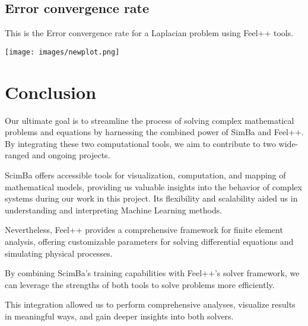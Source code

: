 \documentclass[12pt]{article}
\begin{document}

\newpage

\subsection{Error convergence rate }

This is the Error convergence rate for a Laplacian problem using Feel++ tools. 
\begin{frame}{}
    \begin{center}
        \texttt{[image: images/newplot.png]}
    \end{center}
\end{frame}



\newpage

\section{Conclusion}

Our ultimate goal is to streamline the process of solving complex mathematical problems and equations by harnessing the combined power of SimBa and Feel++. By integrating these two computational tools, we aim to contribute to two wide-ranged and ongoing projects.

ScimBa offers accessible tools for visualization, computation, and mapping of mathematical models, providing us valuable insights into the behavior of complex systems during our work in this project. Its flexibility and scalability aided us in understanding and interpreting Machine Learning methods.

Nevertheless, Feel++ provides a comprehensive framework for finite element analysis, offering customizable parameters for solving differential equations and simulating physical processes. 

By combining ScimBa's training capabilities with Feel++'s solver framework, we can leverage the strengths of both tools to solve problems more efficiently. 

This integration allowed us to perform comprehensive analyses, visualize results in meaningful ways, and gain deeper insights into both solvers.
\end{document}
